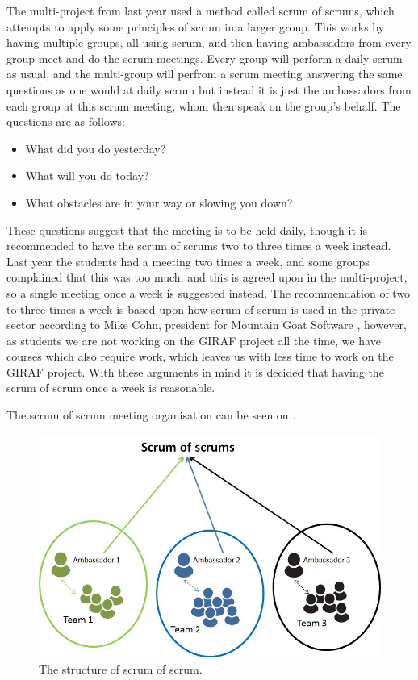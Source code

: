 \bigskip
The multi-project from last year used a method called scrum of scrums, which attempts to apply some principles of scrum in a larger group.
This works by having multiple groups, all using scrum, and then having ambassadors from every group meet and do the scrum meetings. 
Every group will perform a daily scrum as usual, and the multi-group will perfrom a scrum meeting answering the same questions as one would at daily scrum but instead it is just the ambassadors from each group at this scrum meeting, whom then speak on the group's behalf.
The questions are as follows:

\begin{itemize}
	\item What did you do yesterday? 
	\item What will you do today?
	\item What obstacles are in your way or slowing you down?
\end{itemize}

These questions suggest that the meeting is to be held daily, though it is recommended to have the scrum of scrums two to three times a week instead. 
Last year the students had a meeting two times a week, and some groups complained that this was too much, and this is agreed upon in the multi-project, so a single meeting once a week is suggested instead.
The recommendation of two to three times a week is based upon how scrum of scrum is used in the private sector according to Mike Cohn, president for Mountain Goat Software \citep{SCRUMoSCRUM}, however, as students we are not working on the GIRAF project all the time, we have courses which also require work, which leaves us with less time to work on the GIRAF project. 
With these arguments in mind it is decided that having the scrum of scrum once a week is reasonable.

The scrum of scrum meeting organisation can be seen on .

\begin{figure}
\centering
\includegraphics[scale=0.4]{figures/scrumofscrum.png}
\caption{The structure of scrum of scrum.}
\label{fig:scrumofscrum}
\end{figure}

